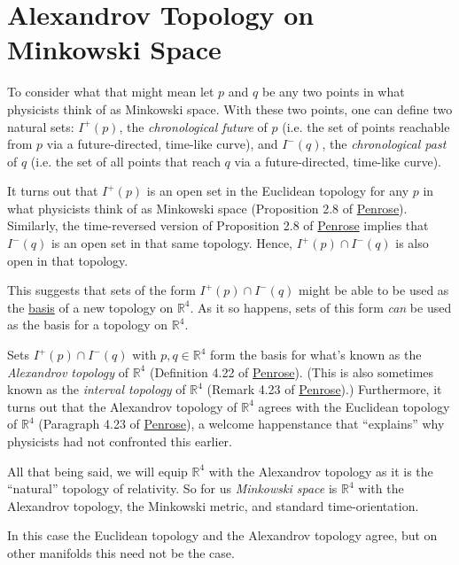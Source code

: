 \section{Alexandrov Topology on Minkowski Space}\label{sctn:alexandrov-topology-on-minkowski-space}
To consider what that might mean let $p$ and $q$ be any two points in what physicists think of as Minkowski space. With these two points, one can define two natural sets: $I^+(p)$, the \textit{chronological future} of $p$ (i.e. the set of points reachable from $p$ via a future-directed, time-like curve), and $I^-(q)$, the \textit{chronological past} of $q$ (i.e. the set of all points that reach $q$ via a future-directed, time-like curve).

It turns out that $I^+(p)$ is an open set in the Euclidean topology for any $p$ in what physicists think of as Minkowski space (Proposition 2.8 of \href{https://doi.org/10.1137/1.9781611970609}{Penrose}). Similarly, the time-reversed version of Proposition 2.8 of \href{https://doi.org/10.1137/1.9781611970609}{Penrose} implies that $I^-(q)$ is an open set in that same topology. Hence, $I^+(p) \cap I^-(q)$ is also open in that topology.

This suggests that sets of the form $I^+(p) \cap I^-(q)$ might be able to be used as the \href{https://ncatlab.org/nlab/show/topological+base}{basis} of a new topology on $\mathbb{R}^4$. As it so happens, sets of this form \textit{can} be used as the basis for a topology on $\mathbb{R}^4$.

Sets $I^+(p) \cap I^-(q)$ with $p,q \in \mathbb{R}^4$ form the basis for what's known as the \textit{Alexandrov topology} of $\mathbb{R}^4$ (Definition 4.22 of \href{https://doi.org/10.1137/1.9781611970609}{Penrose}). (This is also sometimes known as the \textit{interval topology} of $\mathbb{R}^4$ (Remark 4.23 of \href{https://doi.org/10.1137/1.9781611970609}{Penrose}).) Furthermore, it turns out that the Alexandrov topology of $\mathbb{R}^4$ agrees with the Euclidean topology of $\mathbb{R}^4$ (Paragraph 4.23 of \href{https://doi.org/10.1137/1.9781611970609}{Penrose}), a welcome happenstance that ``explains'' why physicists had not confronted this earlier.

All that being said, we will equip $\mathbb{R}^4$ with the Alexandrov topology as it is the ``natural'' topology of relativity.  So for us \textit{Minkowski space} is $\mathbb{R}^4$ with the Alexandrov topology, the Minkowski metric, and standard time-orientation.

In this case the Euclidean topology and the Alexandrov topology agree, but on other manifolds this need not be the case.
